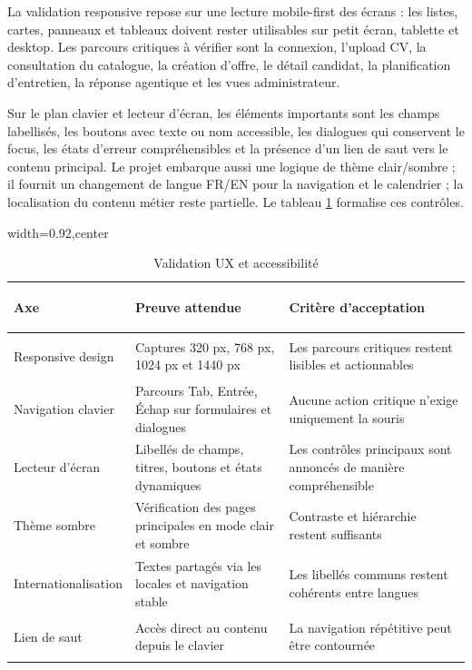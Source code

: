 La validation responsive repose sur une lecture mobile-first des écrans : les listes, cartes, panneaux et tableaux doivent rester utilisables sur petit écran, tablette et desktop. Les parcours critiques à vérifier sont la connexion, l'upload CV, la consultation du catalogue, la création d'offre, le détail candidat, la planification d'entretien, la réponse agentique et les vues administrateur.

Sur le plan clavier et lecteur d'écran, les éléments importants sont les champs labellisés, les boutons avec texte ou nom accessible, les dialogues qui conservent le focus, les états d'erreur compréhensibles et la présence d'un lien de saut vers le contenu principal. Le projet embarque aussi une logique de thème clair/sombre ; il fournit un changement de langue FR/EN pour la navigation et le calendrier ; la localisation du contenu métier reste partielle. Le tableau \ref{tab:ux-accessibility-validation} formalise ces contrôles.

\begin{table}[H]
  \centering
  \scriptsize
  \caption{\label{tab:ux-accessibility-validation}Validation UX et accessibilité}
  \setlength{\tabcolsep}{3pt}
  \begin{adjustbox}{width=0.92\linewidth,center}
  \begin{tabularx}{\linewidth}{>{\bfseries\raggedright\arraybackslash}p{2.7cm}>{\raggedright\arraybackslash}X>{\raggedright\arraybackslash}X}
    \toprule
    Axe & Preuve attendue & Critère d'acceptation \\
    \midrule
    Responsive design & Captures 320 px, 768 px, 1024 px et 1440 px & Les parcours critiques restent lisibles et actionnables \\
    Navigation clavier & Parcours Tab, Entrée, Échap sur formulaires et dialogues & Aucune action critique n'exige uniquement la souris \\
    Lecteur d'écran & Libellés de champs, titres, boutons et états dynamiques & Les contrôles principaux sont annoncés de manière compréhensible \\
    Thème sombre & Vérification des pages principales en mode clair et sombre & Contraste et hiérarchie restent suffisants \\
    Internatio\-nalisation & Textes partagés via les locales et navigation stable & Les libellés communs restent cohérents entre langues \\
    Lien de saut & Accès direct au contenu depuis le clavier & La navigation répétitive peut être contournée \\
    \bottomrule
  \end{tabularx}
  \end{adjustbox}
\end{table}

